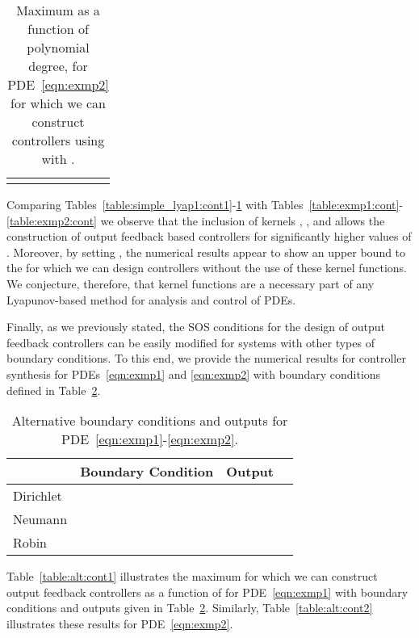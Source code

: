 \documentclass[US letter, 9 pt, conference]{ieeeconf}  \usepackage{setspace}
\begin{document}
\begin{table}{}
\caption{Maximum  as a function of polynomial degree,  for PDE~\eqref{eqn:exmp2} for which we can construct controllers using  with .}
\vspace{-10pt}
\begin{center}
    \begin{tabular}{l *{7}{c}}\hline
     &  &  &   \\ \hline
     &  &   & 
\end{tabular}
\end{center}
\label{table:simple_lyap1:cont2}
\end{table}

Comparing Tables~\ref{table:simple_lyap1:cont1}-\ref{table:simple_lyap1:cont2} with Tables~\ref{table:exmp1:cont}-\ref{table:exmp2:cont} we observe that the inclusion of kernels , ,  and  allows the construction of output feedback based controllers for significantly higher values of . Moreover, by setting , the numerical results appear to show an upper bound to the  for which we can design controllers without the use of these kernel functions. We conjecture, therefore, that kernel functions are a necessary part of any Lyapunov-based method for analysis and control of PDEs.

Finally, as we previously stated, the SOS conditions for the design of output feedback controllers can be easily modified for systems with other types of boundary conditions. To this end, we provide the numerical results for controller synthesis for PDEs~\eqref{eqn:exmp1} and \eqref{eqn:exmp2} with boundary conditions defined in Table~\ref{table:alt_BC}.
\begin{table}{}
\caption{Alternative boundary conditions and outputs for PDE~\eqref{eqn:exmp1}-\eqref{eqn:exmp2}.}
\begin{center}
    \begin{tabular}{l *{3}{c}}\hline
  & Boundary Condition & Output   \\ \hline
   Dirichlet & {} &   \\ \hline
   Neumann & {} &  \\ \hline
   Robin & {} & 
\end{tabular}
\end{center}
\label{table:alt_BC}
\end{table}
Table~\ref{table:alt:cont1} illustrates the maximum  for which we can construct output feedback controllers as a function of  for PDE~\eqref{eqn:exmp1} with boundary conditions and outputs given in Table~\ref{table:alt_BC}. Similarly, Table~\ref{table:alt:cont2} illustrates these results for PDE~\eqref{eqn:exmp2}.
\end{document}
